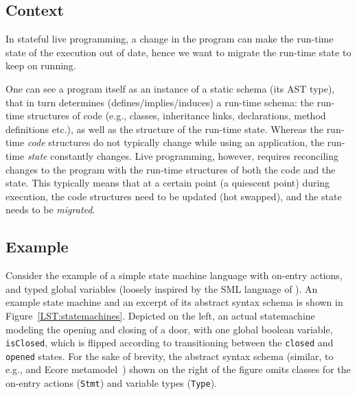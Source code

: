 \documentclass[english,submission]{programming}
\begin{document}
\subsection{Context}
In stateful live programming, a change in the program can make the run-time state of the execution out of date, hence we want to migrate the run-time state to keep on running.

One can see a program itself as an instance of a static schema (its AST type), that in turn determines (defines/implies/induces) a run-time schema: the run-time structures of code (e.g., classes, inheritance links, declarations, method definitions etc.), as well as the structure of the run-time state. Whereas the run-time \textit{code} structures do not typically change while using an application, the run-time \textit{state} constantly changes.
Live programming, however, requires reconciling changes to the program with the run-time structures of both the code and the state. This typically means that at a certain point (a quiescent point) during execution, the code structures need to be updated (hot swapped), and the state needs to be \textit{migrated}.

\subsection{Example}
Consider the example of a simple state machine language with on-entry actions, and typed global variables (loosely inspired by the SML language of \citet{vanRozen19}). An example state machine and an excerpt of its abstract syntax schema is shown in Figure~\ref{LST:statemachines}. Depicted on the left, an actual statemachine modeling the opening and closing of a door, with one global boolean variable, \lstinline{isClosed}, which is flipped according to transitioning between the \lstinline{closed} and \lstinline{opened} states. For the sake of brevity, the abstract syntax schema (similar, to e.g., and Ecore metamodel~\cite{EMF}) shown on the right of the figure omits classes for the on-entry actions (\lstinline{Stmt}) and variable types (\lstinline{Type}).
\end{document}

